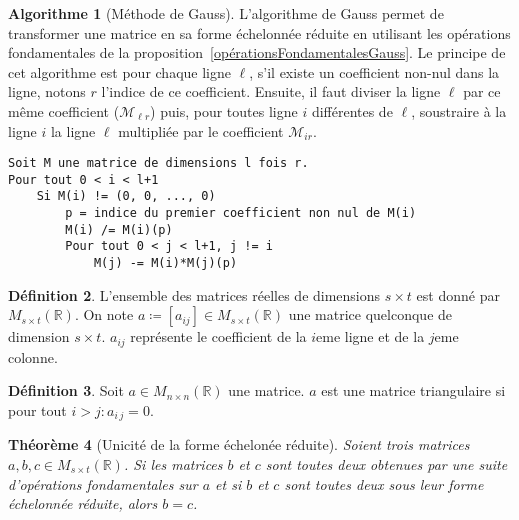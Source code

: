 \documentclass{article}
\newcommand{\R}{\mathbb R}
\newcommand{\M}[3]{M_{#1 \times #2}(#3)}
\newtheorem{thm}{Théorème}[section]
\theoremstyle{definition}
\newtheorem{alg}[thm]{Algorithme}
\newtheorem{déf}[thm]{Définition}
\theoremstyle{remark}
\begin{document}
		\begin{alg}[Méthode de Gauss]\label{algoGauss} L'algorithme de Gauss permet de transformer une matrice en sa forme échelonnée réduite en utilisant les opérations
		fondamentales de la proposition~\ref{opérationsFondamentalesGauss}. Le principe de cet algorithme est pour chaque ligne $\ell$, s'il existe un coefficient non-nul
		dans la ligne, notons $r$ l'indice de ce coefficient. Ensuite, il faut diviser la ligne $\ell$ par ce même coefficient ($\mathcal M_{\ell r}$) puis, pour toutes
		ligne $i$ différentes de $\ell$, soustraire à la ligne $i$ la ligne $\ell$ multipliée par le coefficient $\mathcal M_{i r}$.
\begin{verbatim}
Soit M une matrice de dimensions l fois r.
Pour tout 0 < i < l+1
    Si M(i) != (0, 0, ..., 0)
        p = indice du premier coefficient non nul de M(i)
        M(i) /= M(i)(p)
        Pour tout 0 < j < l+1, j != i
            M(j) -= M(i)*M(j)(p)
\end{verbatim}
		\end{alg}

		\begin{déf} L'ensemble des matrices réelles de dimensions $s \times t$ est donné par $\M st\R$. On note $a \coloneqq [a_{ij}] \in M_{s \times t}(\R)$
		une matrice quelconque de dimension $s \times t$. $a_{ij}$ représente le coefficient de la $i$eme ligne et de la $j$eme colonne. \end{déf}

		\begin{déf} Soit $a \in \M nn\R$ une matrice. $a$ est une matrice triangulaire si pour tout $i > j : a_{i\,j} = 0$. \end{déf}

		\begin{thm}[Unicité de la forme échelonée réduite] Soient trois matrices $a, b, c \in \M st\R$. Si les matrices $b$ et $c$ sont toutes deux obtenues par une suite
		d'opérations fondamentales sur $a$ et si $b$ et $c$ sont toutes deux sous leur forme échelonnée réduite, alors $b = c$. \end{thm}
\end{document}
